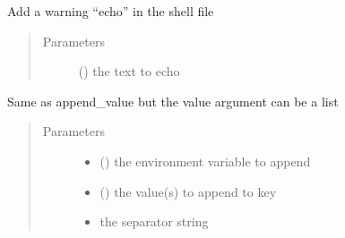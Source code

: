 \documentclass[a4paper,10pt,english]{sphinxmanual}
\begin{document}
\begin{fulllineitems}
\begin{fulllineitems}
\begin{quote}
\begin{description}
\end{description}\end{quote}

\end{fulllineitems}


\begin{fulllineitems}
\label{\detokenize{commands/apidoc/src:src.fileEnviron.FileEnviron.add_warning}}
Add a warning “echo” in the shell file
\begin{quote}\begin{description}
\item[{Parameters}] \leavevmode
{} () \textendash{} the text to echo

\end{description}\end{quote}

\end{fulllineitems}


\begin{fulllineitems}
\label{\detokenize{commands/apidoc/src:src.fileEnviron.FileEnviron.append}}
Same as append\_value but the value argument can be a list
\begin{quote}\begin{description}
\item[{Parameters}] \leavevmode\begin{itemize}
\item {} 
 () \textendash{} the environment variable to append

\item {} 
 () \textendash{} the value(s) to append to key

\item {} 
 \textendash{} the separator string


\end{itemize}
\end{description}
\end{quote}
\end{fulllineitems}
\end{fulllineitems}
\end{document}
